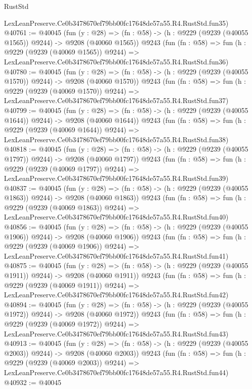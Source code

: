 \begin{lexlean}{RustStd}
\begin{coremodule}
    LexLeanPreserve.Ce0b3478670ef79bb00fc17648de57a55.R4.RustStd.fun35)
@40761 := @40045
    (fun (y : @28) =>
    (fn : @58) -> (h : @9229 (@9239 (@40055 @1565)) @9244) -> @9208 (@40060 @1565))
    @9243
    (fun (fn : @58) =>
    fun (h : @9229 (@9239 (@40069 @1565)) @9244) =>
    LexLeanPreserve.Ce0b3478670ef79bb00fc17648de57a55.R4.RustStd.fun36)
@40780 := @40045
    (fun (y : @28) =>
    (fn : @58) -> (h : @9229 (@9239 (@40055 @1570)) @9244) -> @9208 (@40060 @1570))
    @9243
    (fun (fn : @58) =>
    fun (h : @9229 (@9239 (@40069 @1570)) @9244) =>
    LexLeanPreserve.Ce0b3478670ef79bb00fc17648de57a55.R4.RustStd.fun37)
@40799 := @40045
    (fun (y : @28) =>
    (fn : @58) -> (h : @9229 (@9239 (@40055 @1644)) @9244) -> @9208 (@40060 @1644))
    @9243
    (fun (fn : @58) =>
    fun (h : @9229 (@9239 (@40069 @1644)) @9244) =>
    LexLeanPreserve.Ce0b3478670ef79bb00fc17648de57a55.R4.RustStd.fun38)
@40818 := @40045
    (fun (y : @28) =>
    (fn : @58) -> (h : @9229 (@9239 (@40055 @1797)) @9244) -> @9208 (@40060 @1797))
    @9243
    (fun (fn : @58) =>
    fun (h : @9229 (@9239 (@40069 @1797)) @9244) =>
    LexLeanPreserve.Ce0b3478670ef79bb00fc17648de57a55.R4.RustStd.fun39)
@40837 := @40045
    (fun (y : @28) =>
    (fn : @58) -> (h : @9229 (@9239 (@40055 @1863)) @9244) -> @9208 (@40060 @1863))
    @9243
    (fun (fn : @58) =>
    fun (h : @9229 (@9239 (@40069 @1863)) @9244) =>
    LexLeanPreserve.Ce0b3478670ef79bb00fc17648de57a55.R4.RustStd.fun40)
@40856 := @40045
    (fun (y : @28) =>
    (fn : @58) -> (h : @9229 (@9239 (@40055 @1906)) @9244) -> @9208 (@40060 @1906))
    @9243
    (fun (fn : @58) =>
    fun (h : @9229 (@9239 (@40069 @1906)) @9244) =>
    LexLeanPreserve.Ce0b3478670ef79bb00fc17648de57a55.R4.RustStd.fun41)
@40875 := @40045
    (fun (y : @28) =>
    (fn : @58) -> (h : @9229 (@9239 (@40055 @1911)) @9244) -> @9208 (@40060 @1911))
    @9243
    (fun (fn : @58) =>
    fun (h : @9229 (@9239 (@40069 @1911)) @9244) =>
    LexLeanPreserve.Ce0b3478670ef79bb00fc17648de57a55.R4.RustStd.fun42)
@40894 := @40045
    (fun (y : @28) =>
    (fn : @58) -> (h : @9229 (@9239 (@40055 @1972)) @9244) -> @9208 (@40060 @1972))
    @9243
    (fun (fn : @58) =>
    fun (h : @9229 (@9239 (@40069 @1972)) @9244) =>
    LexLeanPreserve.Ce0b3478670ef79bb00fc17648de57a55.R4.RustStd.fun43)
@40913 := @40045
    (fun (y : @28) =>
    (fn : @58) -> (h : @9229 (@9239 (@40055 @2003)) @9244) -> @9208 (@40060 @2003))
    @9243
    (fun (fn : @58) =>
    fun (h : @9229 (@9239 (@40069 @2003)) @9244) =>
    LexLeanPreserve.Ce0b3478670ef79bb00fc17648de57a55.R4.RustStd.fun44)
@40932 := @40045

\end{coremodule}
\end{lexlean}
